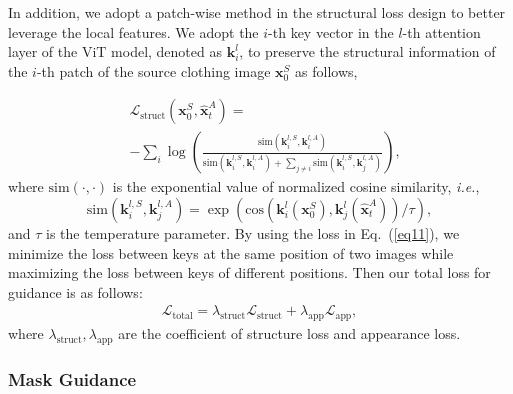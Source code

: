In addition, we adopt a patch-wise method in the structural loss design to better leverage the local features. We adopt the $i$-th key vector in the $l$-th attention layer of the ViT model, denoted as $\boldsymbol{k}_i^l$, to preserve the structural information of the $i$-th patch of the source clothing image $\mathbf{x}^{S}_0$ as follows,

\begin{equation}
\begin{aligned}
    \label{eq11}
    & \mathcal{L}_{\text{struct}}(\mathbf{x}^{S}_0,\hat{\mathbf{x}}^{A}_t) = \\
    & -\sum_{i}\log\left(\frac{\mathrm{sim}(\boldsymbol{k}_i^{l,S}, \boldsymbol{k}_i^{l,A})}{ \mathrm{sim}(\boldsymbol{k}_i^{l,S}, \boldsymbol{k}_i^{l,A}) + \sum_{j\neq i} \mathrm{sim}(\boldsymbol{k}_i^{l,S}, \boldsymbol{k}_j^{l,A})}\right),
\end{aligned}
\end{equation}
where $\mathrm{sim}(\cdot,\cdot)$ is the exponential value of normalized cosine similarity, \textit{i.e.},
\begin{equation}
\label{eq13}
    \mathrm{sim}(\boldsymbol{k}_i^{l,S}, \boldsymbol{k}_j^{l,A}) = \exp \left(\mathrm{cos}\left(\boldsymbol{k}^l_i(\mathbf{x}^{S}_0), \boldsymbol{k}^l_j(\hat{\mathbf{x}}^{A}_{t})\right)/\tau \right),
\end{equation}
and $\tau$ is the temperature parameter. 
By using the loss in Eq.~(\ref{eq11}), we minimize the loss between keys at the same position of two images while maximizing the loss between keys of different positions.
Then our total loss for guidance is as follows:
\begin{equation}
\begin{aligned}
    \label{eq14}
    \mathcal{L}_{\text{total}} = \lambda_{\text{struct}}\mathcal{L}_{\text{struct}}+ \lambda_{\text{app}}\mathcal{L}_{\text{app}}, 
\end{aligned}
\end{equation}
where $\lambda_{\text{struct}},\lambda_{\text{app}}$ are the coefficient of structure loss and appearance loss.


\subsubsection{Mask Guidance}
\label{sec:mask}

